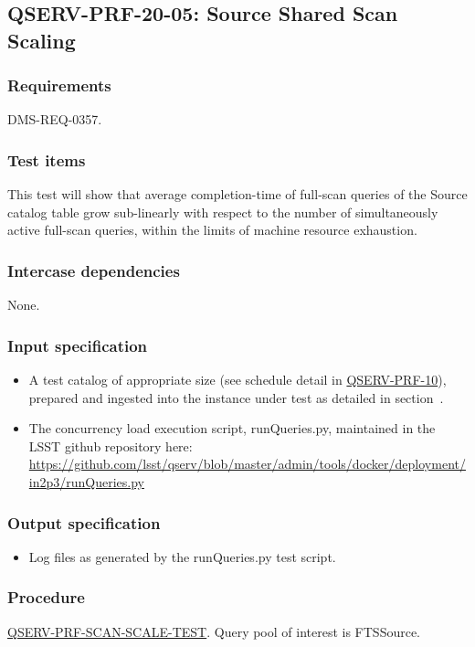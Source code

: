 \subsection{\textsc{QSERV-PRF-20-05}: Source Shared Scan Scaling}
\label{qserv-prf-20-05}

\subsubsection{Requirements}

DMS-REQ-0357.

\subsubsection{Test items}

This test will show that average completion-time of full-scan queries of the Source catalog table grow 
sub-linearly with respect to the number of simultaneously active full-scan queries, within the limits of 
machine resource exhaustion.

\subsubsection{Intercase dependencies}

None.

\subsubsection{Input specification}

\begin{itemize}

  \item{A test catalog of appropriate size (see schedule detail in \hyperref[qserv-prf-10]{\textsc{
  QSERV-PRF-10}}), prepared and ingested into the \product{} instance under test as detailed in 
  section~.}

  \item{The concurrency load execution script, runQueries.py, maintained in the LSST \product{}
  github repository here: \url{https://github.com/lsst/qserv/blob/master/admin/tools/docker/deployment/in2p3/runQueries.py}}

\end{itemize}

\subsubsection{Output specification}

\begin{itemize}
  \item{Log files as generated by the runQueries.py test script.}
\end{itemize}

\subsubsection{Procedure}

\hyperref[qserv-prf-scan-scale-test]{\textsc{QSERV-PRF-SCAN-SCALE-TEST}}.
Query pool of interest is FTSSource.
